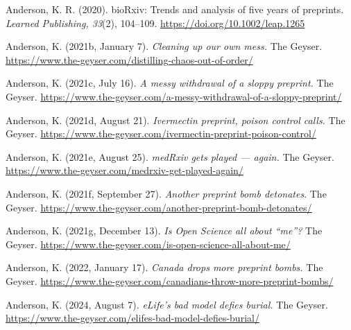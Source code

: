 \documentclass[authordate, perspective]{jote-new-article}
\begin{document}
	Anderson, K. R. (2020). bioRxiv: Trends and analysis of five years of preprints. \emph{Learned Publishing, 33}(2), 104--109. \url{https://doi.org/10.1002/leap.1265}







	Anderson, K. (2021b, January 7). \emph{Cleaning up our own mess. }The Geyser. \url{https://www.the-geyser.com/distilling-chaos-out-of-order/}







	Anderson, K. (2021c, July 16). \emph{A messy withdrawal of a sloppy preprint.} The Geyser. \url{https://www.the-geyser.com/a-messy-withdrawal-of-a-sloppy-preprint/}







	Anderson, K. (2021d, August 21). \emph{Ivermectin preprint, poison control calls. }The Geyser. \url{https://www.the-geyser.com/ivermectin-preprint-poison-control/}







	Anderson, K. (2021e, August 25). \emph{medRxiv gets played — again. }The Geyser. \url{https://www.the-geyser.com/medrxiv-get-played-again/}







	Anderson, K. (2021f, September 27). \emph{Another preprint bomb detonates}. The Geyser. \url{https://www.the-geyser.com/another-preprint-bomb-detonates/}







	Anderson, K. (2021g, December 13). \emph{Is Open Science all about “me”?} The Geyser. \url{https://www.the-geyser.com/is-open-science-all-about-me/}







	Anderson, K. (2022, January 17). \emph{Canada drops more preprint bombs.} The Geyser. \url{https://www.the-geyser.com/canadians-throw-more-preprint-bombs/}







	Anderson, K. (2024, August 7). \emph{eLife's bad model defies burial.} The Geyser. \url{https://www.the-geyser.com/elifes-bad-model-defies-burial/}
\end{document}
